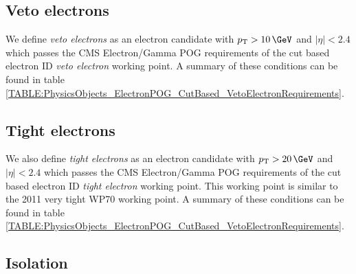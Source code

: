 \subsection{Veto electrons}

We define \textit{veto electrons} as an electron candidate with $\pt>10\,\GeV$ and $|\eta|<2.4$ which passes the \gls{CMS} Electron/Gamma \gls{POG} requirements of the cut based electron \gls{ID} \textit{veto electron} working point. A summary of these conditions can be found in table \ref{TABLE:PhysicsObjects_ElectronPOG_CutBased_VetoElectronRequirements}.
 


\subsection{Tight electrons}


We also define \textit{tight electrons} as an electron candidate with $\pt>20\,\GeV$ and $|\eta|<2.4$ which passes the \gls{CMS} Electron/Gamma \gls{POG} requirements of the cut based electron \gls{ID} \textit{tight electron} working point. This working point is similar to the 2011 very tight WP70 working point. A summary of these conditions can be found in table \ref{TABLE:PhysicsObjects_ElectronPOG_CutBased_VetoElectronRequirements}.



\subsection{Isolation}
\label{SUBSECTION:EventReconstructionPhysicsObjects_LeptonIsolation_Isolation}



